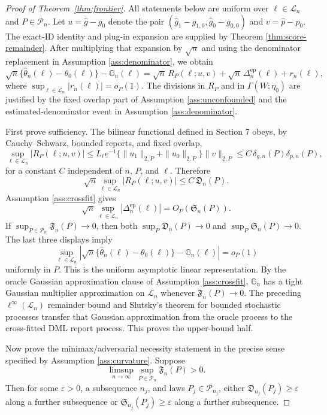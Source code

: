 \begin{proof}[Proof of Theorem~\ref{thm:frontier}]
All statements below are uniform over \(\ell\in\mathcal{L}_n\) and
\(P\in\mathcal{P}_n\).  Let \(u=\hat g-g_0\) denote the pair
\((\hat g_1-g_{1,0},\hat g_0-g_{0,0})\) and \(v=\hat p-p_0\).  The exact-ID
identity and plug-in expansion are supplied by Theorem
\ref{thm:score-remainder}.  After multiplying that expansion by \(\sqrt n\)
and using the denominator replacement in Assumption \ref{ass:denominator}, we
obtain
\[
\sqrt n\{\hat\theta_n(\ell)-\theta_0(\ell)\}-\mathbb{G}_n(\ell)
=\sqrt n\,R_P(\ell;u,v)
+\sqrt n\,\Delta^{\mathrm{ep}}_n(\ell)+r_n(\ell),
\]
where \(\sup_{\ell\in\mathcal{L}_n}|r_n(\ell)|=o_P(1)\).  The divisions in
\(R_P\) and in \(\Gamma(W;\eta_0)\) are justified by the fixed overlap part of
Assumption \ref{ass:unconfounded} and the estimated-denominator event in
Assumption \ref{ass:denominator}.

First prove sufficiency.  The bilinear functional defined in Section 7 obeys,
by Cauchy--Schwarz, bounded reports, and fixed overlap,
\[
\sup_{\ell\in\mathcal{L}_n}|R_P(\ell;u,v)|
\le L_\ell\underline e^{-1}
\{\|u_1\|_{2,P}+\|u_0\|_{2,P}\}\|v\|_{2,P}
\le C\,\delta_{g,n}(P)\delta_{p,n}(P),
\]
for a constant \(C\) independent of \(n\), \(P\), and \(\ell\).  Therefore
\[
\sqrt n\sup_{\ell\in\mathcal{L}_n}|R_P(\ell;u,v)|
\le C\,\mathfrak{D}_n(P).
\]
Assumption \ref{ass:crossfit} gives
\[
\sqrt n\sup_{\ell\in\mathcal{L}_n}
|\Delta^{\mathrm{ep}}_n(\ell)|=O_P(\mathfrak{S}_n(P)).
\]
If \(\sup_{P\in\mathcal{P}_n}\mathfrak{F}_n(P)\to0\), then both
\(\sup_P\mathfrak{D}_n(P)\to0\) and \(\sup_P\mathfrak{S}_n(P)\to0\).  The last
three displays imply
\[
\sup_{\ell\in\mathcal{L}_n}
\left|\sqrt n\{\hat\theta_n(\ell)-\theta_0(\ell)\}
-\mathbb{G}_n(\ell)\right|=o_P(1)
\]
uniformly in \(P\).  This is the uniform asymptotic linear representation.  By
the oracle Gaussian approximation clause of Assumption \ref{ass:crossfit},
\(\mathbb{G}_n\) has a tight Gaussian multiplier approximation on
\(\mathcal{L}_n\) whenever \(\mathfrak{F}_n(P)\to0\).  The preceding
\(\ell^\infty(\mathcal{L}_n)\) remainder bound and Slutsky's theorem for
bounded stochastic processes transfer that Gaussian approximation from the
oracle process to the cross-fitted DML report process.  This proves the
upper-bound half.

Now prove the minimax/adversarial necessity statement in the precise sense
specified by Assumption \ref{ass:curvature}.  Suppose
\[
\limsup_{n\to\infty}\sup_{P\in\mathcal{P}_n}\mathfrak{F}_n(P)>0.
\]
Then for some \(\varepsilon>0\), a subsequence \(n_j\), and laws
\(P_j\in\mathcal{P}_{n_j}\), either
\(\mathfrak{D}_{n_j}(P_j)\ge\varepsilon\) along a further subsequence or
\(\mathfrak{S}_{n_j}(P_j)\ge\varepsilon\) along a further subsequence.


\end{proof}
